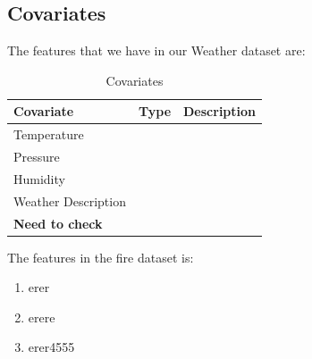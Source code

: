 \documentclass[10pt]{article}
\begin{document}
\subsection{Covariates}
The features that we have in our Weather dataset are:
\begin{table}[H]
    \centering
    \caption{Covariates}
    \begin{tabular}{l|l|l}
        Covariate &Type &Description\\\hline
        Temperature & &\\
        Pressure & &\\
        Humidity & &\\
        Weather Description & &\\
        \textbf{Need to check} & &\\
    \end{tabular}
\end{table}
The features in the fire dataset is:
\begin{enumerate}
    \item erer
    \item erere
    \item erer4555
\end{enumerate}
\end{document}
